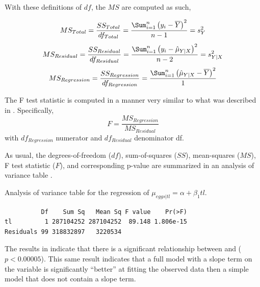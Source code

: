 \documentclass[10pt,openany]{book}\usepackage[]{graphicx}\usepackage[]{color}
\makeatletter
\newenvironment{kframe}{%
 \def\at@end@of@kframe{}%
 \ifinner\ifhmode%
  \def\at@end@of@kframe{\end{minipage}}%
  \begin{minipage}{\columnwidth}%
 \fi\fi%
 \def\FrameCommand##1{\hskip\@totalleftmargin \hskip-\fboxsep
 \colorbox{shadecolor}{##1}\hskip-\fboxsep
     \hskip-\linewidth \hskip-\@totalleftmargin \hskip\columnwidth}%
 \MakeFramed {\advance\hsize-\width
   \@totalleftmargin\z@ \linewidth\hsize
   \@setminipage}}%
 {\par\unskip\endMakeFramed%
 \at@end@of@kframe}
\newenvironment{knitrout}{}{} %
\makeatother
\begin{document}

With these definitions of $df$, the $MS$ are computed as such,

\begin{equation}\label{eqn:SLRsimpleMS}
  MS_{Total} = \frac{SS_{Total}}{df_{Total}} = \frac{\Sum_{i=1}^{n}\left(y_{i}-\overline{Y}\right)^{2}}{n-1} = s_{Y}^{2}
\end{equation}
\begin{equation}\label{eqn:SLRfullMS}
  MS_{Residual} = \frac{SS_{Residual}}{df_{Residual}} = \frac{\Sum_{i=1}^{n}\left(y_{i}-\hat{\mu}_{Y|X}\right)^{2}}{n-2} = s_{Y|X}^{2}
\end{equation}
\[ MS_{Regression} = \frac{SS_{Regression}}{df_{Regression}} = \frac{\Sum_{i=1}^{n}\left(\hat{\mu}_{Y|X}-\overline{Y}\right)^{2}}{1} \]

The F test statistic is computed in a manner very similar to what was described in .  Specifically,
\[ F = \frac{MS_{Regression}}{MS_{Residual}} \]
with $df_{Regression}$ numerator and $df_{Residual}$ denominator df.

As usual, the degrees-of-freedom ($df$), sum-of-squares ($SS$), mean-squares ($MS$), F test statistic ($F$), and corresponding p-value are summarized in an analysis of variance table .

\begin{table}[h]
  \centering
  \caption{Analysis of variance table for the regression of $\mu_{eggs|tl} = \alpha + \beta_{1}tl$.}\label{tab:SLRLTANOVA}
\begin{knitrout}
\color{fgcolor}\begin{kframe}
\begin{verbatim}
          Df    Sum Sq   Mean Sq F value    Pr(>F)
tl         1 287104252 287104252  89.148 1.806e-15
Residuals 99 318832897   3220534                  
\end{verbatim}
\end{kframe}
\end{knitrout}
\end{table}


The results in  indicate that there is a significant relationship between  and  ($p<0.00005$).  This same result indicates that a full model with a slope term on the  variable is significantly ``better'' at fitting the observed data then a simple model that does not contain a slope term.
\end{document}
